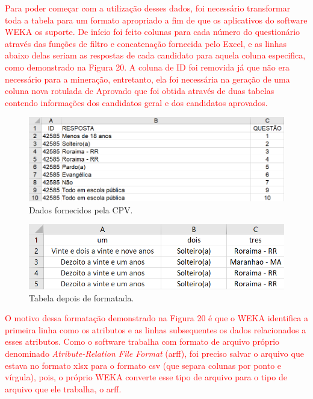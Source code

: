 \par
\textcolor{red}{Para poder começar com a utilização desses dados, foi necessário transformar toda a tabela para um formato apropriado a fim de que os aplicativos do software WEKA os suporte. De início foi feito colunas para cada número do questionário através das funções de filtro e concatenação fornecida pelo Excel, e as linhas abaixo delas seriam as respostas de cada candidato para aquela coluna especifica, como demonstrado na Figura 20. A coluna de ID foi removida já que não era necessário para a mineração, entretanto, ela foi necessária na geração de uma coluna nova rotulada de Aprovado que foi obtida através de duas tabelas contendo informações dos candidatos geral e dos candidatos aprovados.}


\par
\begin{figure}[!htp]
	\begin{center}
    \caption{\label{fig:waveform_fig} Dados fornecidos pela CPV.}
	\includegraphics[scale=0.65]{Figuras/Formato_errado.png}
	\end{center}
\end{figure}

\par
\begin{figure}[!htp]
	\begin{center}
    \caption{\label{fig:waveform_fig} Tabela depois de formatada.}
	\includegraphics[scale=0.65]{Figuras/Formato_certo.png}
	\end{center}
\end{figure}

\par
\textcolor{red}{O motivo dessa formatação demonstrado na Figura 20 é que o WEKA identifica a primeira linha como os atributos e as linhas subsequentes os dados relacionados a esses atributos. Como o software trabalha com formato de arquivo próprio denominado \textit{Atribute-Relation File Format} (arff), foi preciso salvar o arquivo que estava no formato xlsx para o formato csv (que separa colunas por ponto e vírgula), pois, o próprio WEKA converte esse tipo de arquivo para o tipo de arquivo que ele trabalha, o arff.}

